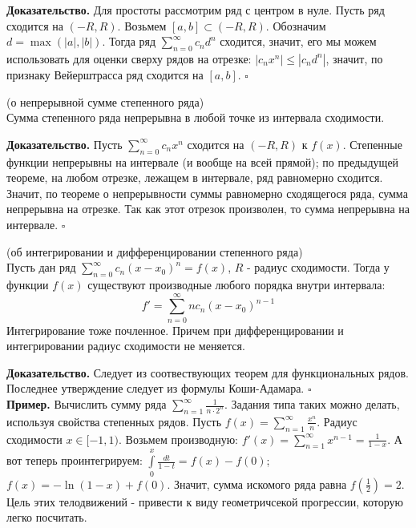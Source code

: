 \textbf{Доказательство.} Для простоты рассмотрим ряд с центром в нуле. 
Пусть ряд сходится на $(-R,R)$. Возьмем  $[a,b]\subset (-R,R)$. Обозначим
$d=\max(|a|,|b|)$. Тогда ряд  $\sum\limits_{n=0}^{\infty} c_nd^n$ сходится,
значит, его мы можем использовать для оценки сверху рядов на отрезке:
$|c_nx^n|\leqslant |c_nd^n|$, значит, по признаку Вейерштрасса ряд сходится
на $[a,b]$.
$\square$ 
\begin{theor}
    (о непрерывной сумме степенного ряда)\\
    Сумма степенного ряда непрерывна в любой точке из интервала сходимости.
\end{theor}
\textbf{Доказательство.}  Пусть $\sum\limits_{n=0}^{\infty}c_nx^n$ 
сходится на $(-R,R)$ к  $f(x)$. Степенные функции непрерывны на интервале
(и вообще на всей прямой); по предыдущей теореме, на любом отрезке,
лежащем в интервале, ряд равномерно сходится. Значит, по теореме о 
непрерывности суммы равномерно сходящегося ряда, сумма непрерывна на 
отрезке. Так как этот отрезок произволен, то сумма непрерывна на интервале.
$\square$ 
\begin{theor}
    (об интегрировании и дифференцировании степенного ряда)\\
Пусть дан ряд $\sum\limits_{n=0}^{\infty} c_n(x-x_0)^n=f(x)$, $R$ - радиус 
сходимости. Тогда у функции  $f(x)$ существуют производные любого порядка
внутри интервала:
$$f'=\sum\limits_{n=0}^{\infty} nc_n(x-x_0)^{n-1}$$ 
Интегрирование тоже почленное. 
Причем при дифференцировании и интегрировании радиус сходимости не меняется.
\end{theor}
\textbf{Доказательство.}  Следует из соотвествующих теорем для функциональных
рядов. Последнее утверждение следует из формулы Коши-Адамара. 
$\square$\\ 
\textbf{Пример.} Вычислить сумму ряда $\sum\limits_{n=1}^{\infty} 
\frac{1}{n\cdot 2^n}$. Задания типа таких можно делать, используя 
свойства степенных рядов. Пусть $f(x)=\sum\limits_{n=1}^{\infty}\frac{x^n}{n}$.
Радиус сходимости $x\in[-1,1)$. Возьмем производную:
$f'(x)=\sum\limits_{n=1}^{\infty} x^{n-1}=\frac{1}{1-x}$. А вот теперь
проинтегрируем: $\int\limits^x_0\frac{dt}{1-t}=f(x)-f(0)$;
$f(x)=-\ln(1-x)+f(0)$. Значит, сумма искомого ряда равна $f(\frac{1}{2})=2$.
Цель этих телодвижений - привести к виду геометричсекой прогрессии, которую
легко посчитать. 








